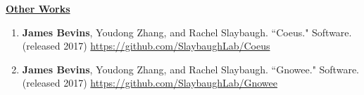 
\underline{\textbf{Other Works}}

\begin{enumerate}
\item \textbf{James Bevins}, Youdong Zhang, and Rachel Slaybaugh. ``Coeus." Software. (released 2017) \url{https://github.com/SlaybaughLab/Coeus} 

\item \textbf{James Bevins}, Youdong Zhang, and Rachel Slaybaugh. ``Gnowee." Software. (released 2017) \url{https://github.com/SlaybaughLab/Gnowee}
\end{enumerate} 
